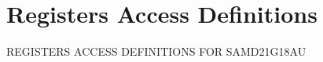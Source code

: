 \hypertarget{group___s_a_m_d21_g18_a_u__reg}{}\section{Registers Access Definitions}
\label{group___s_a_m_d21_g18_a_u__reg}
R\+E\+G\+I\+S\+T\+E\+RS A\+C\+C\+E\+SS D\+E\+F\+I\+N\+I\+T\+I\+O\+NS F\+OR S\+A\+M\+D21\+G18\+AU 